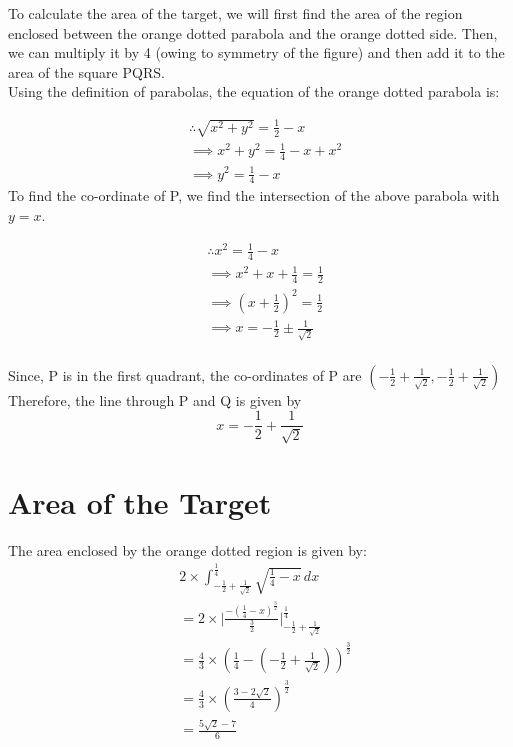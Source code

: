 \documentclass[10pt]{article}
\begin{document}
To calculate the area of the target, we will first find the area of the region enclosed between the orange dotted parabola and the orange dotted side. Then, we can multiply it by 4 (owing to symmetry of the figure) and then add it to the area of the square PQRS.\\

Using the definition of parabolas, the equation of the orange dotted parabola is:

\begin{equation}
\begin{split}
& \therefore \sqrt{{x}^2+{y}^2} = \frac{1}{2} - x\\
&\implies {x}^2+{y}^2 = \frac{1}{4} - x + {x}^2\\
&\implies {y}^2 = \frac{1}{4} - x
\end{split}
\end{equation}
\newpage
To find the co-ordinate of P, we find the intersection of the above parabola with $y = x$.

\begin{equation*}
\begin{split}
& \therefore {x}^2 = \frac{1}{4} - x\\
&\implies {x}^2 + x + \frac{1}{4} = \frac{1}{2}\\
&\implies \left({x + \frac{1}{2}}\right)^2 = \frac{1}{2}\\
&\implies x = - \frac{1}{2} \pm \frac{1}{\sqrt{2}}
\end{split}
\end{equation*}
\\Since, P is in the first quadrant, the co-ordinates of P are $\left(-\frac{1}{2}+\frac{1}{\sqrt{2}}, -\frac{1}{2}+\frac{1}{\sqrt{2}}\right)$
Therefore, the line through P and Q is given by
\begin{equation}
x = - \frac{1}{2} + \frac{1}{\sqrt{2}}
\end{equation}

\section{Area of the Target}
The area enclosed by the orange dotted region is given by:
\begin{equation}
\begin{split}
&2 \times \int_{- \frac{1}{2} + \frac{1}{\sqrt{2}}}^{\frac{1}{4}} \sqrt{\frac{1}{4} - x} \,dx\\
&= 2 \times \Biggl| \frac{-\left({\frac{1}{4} - x}\right)^\frac{3}{2}}{\frac{3}{2}}\Biggr|_{- \frac{1}{2} + \frac{1}{\sqrt{2}}}^{\frac{1}{4}}\\
&= \frac{4}{3} \times \left( \frac{1}{4} - \left(- \frac{1}{2} + \frac{1}{\sqrt{2}}\right) \right)^\frac{3}{2}\\
&= \frac{4}{3} \times \left(\frac{3-2\sqrt{2}}{4}\right)^\frac{3}{2}\\
&= \frac{5\sqrt{2} - 7}{6}\\
\end{split}
\end{equation}
\end{document}

